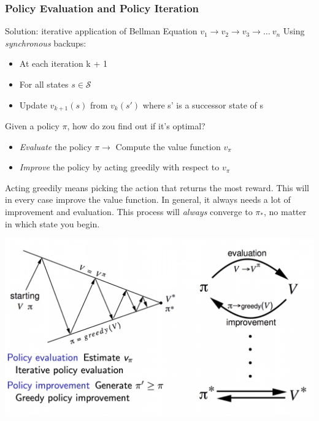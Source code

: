 \documentclass[10pt]{article}
\begin{document}
\subsubsection*{Policy Evaluation and Policy Iteration}
Solution: iterative application of Bellman Equation $v_{1} \rightarrow v_{2}  \rightarrow v_{3}  \rightarrow \ldots \ v_{n}$
Using \textit{synchronous} backups:
\begin{itemize}
\item At each iteration k + 1
\item For all states $s \in \mathcal{S}$
\item Update $v_{k+1}(s)$ from $v_{k}(s')$ where s' is a successor state of s
\end{itemize}

Given a policy $\pi$, how do zou find out if it's optimal?
\begin{itemize}
\item \textit{Evaluate} the policy $\pi \rightarrow$ Compute the value function $v_{\pi}$
\item \textit{Improve} the policy by acting greedily with respect to $v_{\pi}$
\end{itemize}
Acting greedily means picking the action that returns the most reward. This will in every case improve the value function. In general, it always needs a lot of improvement and evaluation. This process will \textit{always} converge to $\pi_{*}$, no matter in which state you begin.

\includegraphics[scale=0.35]{pictures/eval_impr.png}
\end{document}
